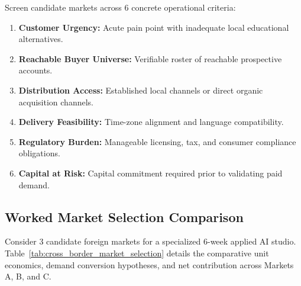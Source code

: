 Screen candidate markets across 6 concrete operational criteria:
\begin{enumerate}
\item \textbf{Customer Urgency:} Acute pain point with inadequate local educational alternatives.
\item \textbf{Reachable Buyer Universe:} Verifiable roster of reachable prospective accounts.
\item \textbf{Distribution Access:} Established local channels or direct organic acquisition channels.
\item \textbf{Delivery Feasibility:} Time-zone alignment and language compatibility.
\item \textbf{Regulatory Burden:} Manageable licensing, tax, and consumer compliance obligations.
\item \textbf{Capital at Risk:} Capital commitment required prior to validating paid demand.
\end{enumerate}

\subsection{Worked Market Selection Comparison}
\label{sec:worked_market_selection_comparison}

Consider 3 candidate foreign markets for a specialized 6-week applied AI studio. Table~\ref{tab:cross_border_market_selection} details the comparative unit economics, demand conversion hypotheses, and net contribution across Markets A, B, and C.

